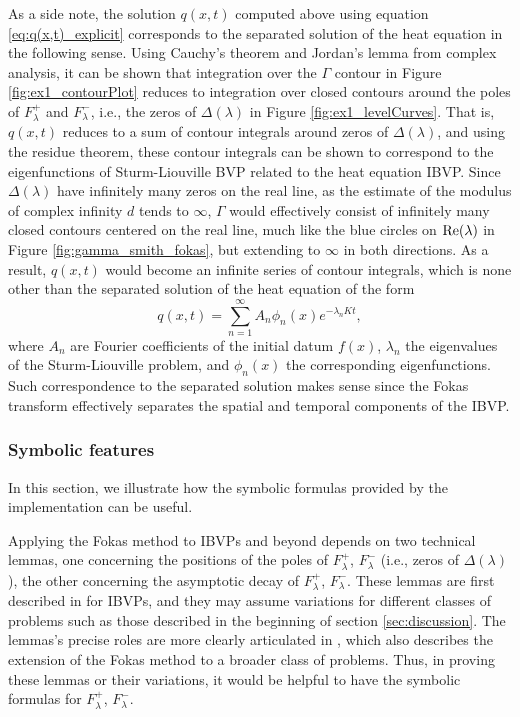\documentclass[12pt, oneside, a4paper]{article}
\begin{document}
As a side note, the solution $q(x,t)$ computed above using equation \eqref{eq:q(x,t)_explicit} corresponds to the separated solution of the heat equation \cite{Pinsky1991} in the following sense. Using Cauchy's theorem and Jordan's lemma from complex analysis, it can be shown that integration over the $\Gamma$ contour in Figure \ref{fig:ex1_contourPlot} reduces to integration over closed contours around the poles of $F^+_\lambda$ and $F^-_\lambda$, i.e., the zeros of $\Delta(\lambda)$ in Figure \ref{fig:ex1_levelCurves}. That is, $q(x,t)$ reduces to a sum of contour integrals around zeros of $\Delta(\lambda)$, and using the residue theorem, these contour integrals can be shown to correspond to the eigenfunctions of Sturm-Liouville BVP related to the heat equation IBVP. Since $\Delta(\lambda)$ have infinitely many zeros on the real line, as the estimate of the modulus of complex infinity $d$ tends to $\infty$, $\Gamma$ would effectively consist of infinitely many closed contours centered on the real line, much like the blue circles on $\mathrm{Re}(\lambda)$ in Figure \ref{fig:gamma_smith_fokas}, but extending to $\infty$ in both directions. As a result, $q(x,t)$ would become an infinite series of contour integrals, which is none other than the separated solution of the heat equation of the form 
\[q(x,t) = \sum_{n=1}^\infty A_n \phi_n(x)e^{-\lambda_n Kt},\]
where $A_n$ are Fourier coefficients of the initial datum $f(x)$, $\lambda_n$ the eigenvalues of the Sturm-Liouville problem, and $\phi_n(x)$ the corresponding eigenfunctions. Such correspondence to the separated solution makes sense since the Fokas transform effectively separates the spatial and temporal components of the IBVP.

\subsubsection{Symbolic features}\label{sec:symbolic_features}

In this section, we illustrate how the symbolic formulas provided by the implementation can be useful.

Applying the Fokas method to IBVPs and beyond depends on two technical lemmas, one concerning the positions of the poles of $F^+_\lambda$, $F^-_\lambda$ (i.e., zeros of $\Delta(\lambda)$), the other concerning the asymptotic decay of $F^+_\lambda$, $F^-_\lambda$. These lemmas are first described in \cite{Smith2012} for IBVPs, and they may assume variations for different classes of problems such as those described in the beginning of section \ref{sec:discussion}. The lemmas's precise roles are more clearly articulated in \cite{Miller2018}, which also describes the extension of the Fokas method to a broader class of problems. Thus, in proving these lemmas or their variations, it would be helpful to have the symbolic formulas for $F^+_\lambda$, $F^-_\lambda$.
\end{document}
